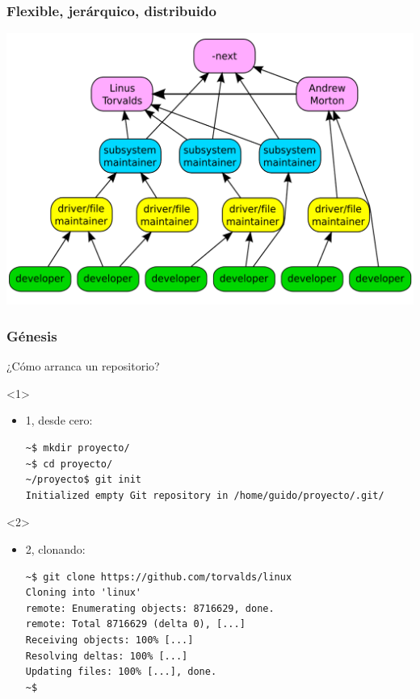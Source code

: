 \documentclass[a4paper, 12pt, aspectratio=169,
\ifhandout handout \else \fi
]{beamer}
\begin{document}
\begin{frame}[fragile]
    \frametitle{Flexible, jerárquico, distribuido}
    \begin{center}
    \includegraphics[keepaspectratio, height=0.8\textheight, width=\linewidth]{flow.png}
    \end{center}
\end{frame}

\begin{frame}[fragile]
    \frametitle{Génesis}
    ¿Cómo arranca un repositorio?
    \begin{onlyenv}<1>
        \begin{itemize}
            \item 1, desde cero:
\begin{lstlisting}
~$ mkdir proyecto/
~$ cd proyecto/
~/proyecto$ git init
Initialized empty Git repository in /home/guido/proyecto/.git/
\end{lstlisting}
        \end{itemize}
    \end{onlyenv}
    \begin{onlyenv}<2>
        \begin{itemize}
            \item 2, clonando:
                \begin{lstlisting}[basicstyle=\ttfamily\small]
~$ git clone https://github.com/torvalds/linux
Cloning into 'linux'
remote: Enumerating objects: 8716629, done.
remote: Total 8716629 (delta 0), [...]
Receiving objects: 100% [...]
Resolving deltas: 100% [...]
Updating files: 100% [...], done.
~$
\end{lstlisting}
        \end{itemize}
    \end{onlyenv}
\end{frame}
\end{document}
